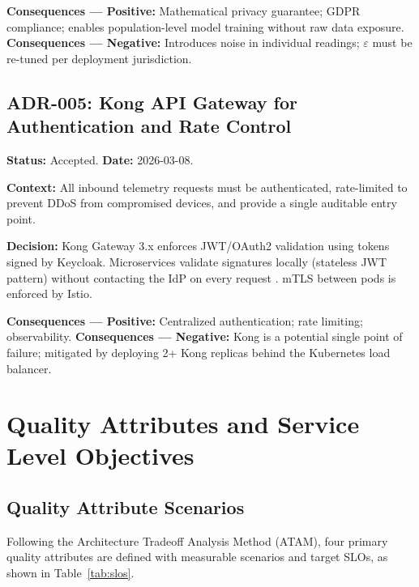 \documentclass[conference]{IEEEtran}
\begin{document}
\textbf{Consequences — Positive:} Mathematical privacy guarantee; GDPR compliance;
enables population-level model training without raw data exposure.
\textbf{Consequences — Negative:} Introduces noise in individual readings;
$\varepsilon$ must be re-tuned per deployment jurisdiction.

\subsection{ADR-005: Kong API Gateway for Authentication and Rate Control}

\textbf{Status:} Accepted. \quad \textbf{Date:} 2026-03-08.

\textbf{Context:} All inbound telemetry requests must be authenticated, rate-limited
to prevent DDoS from compromised devices, and provide a single auditable entry point.

\textbf{Decision:} Kong Gateway 3.x enforces JWT/OAuth2 validation using tokens signed
by Keycloak. Microservices validate signatures locally (stateless JWT pattern) without
contacting the IdP on every request \cite{b9}. mTLS between pods is enforced by Istio.

\textbf{Consequences — Positive:} Centralized authentication; rate limiting; observability.
\textbf{Consequences — Negative:} Kong is a potential single point of failure; mitigated
by deploying 2+ Kong replicas behind the Kubernetes load balancer.

\section{Quality Attributes and Service Level Objectives}

\subsection{Quality Attribute Scenarios}

Following the Architecture Tradeoff Analysis Method (ATAM), four primary quality
attributes are defined with measurable scenarios and target SLOs, as shown in
Table~\ref{tab:slos}.
\end{document}
